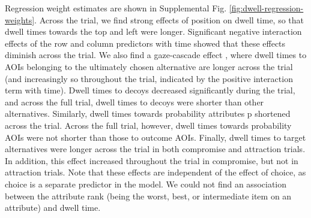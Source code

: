 \documentclass[11pt, a4paper]{article}
\begin{document}
\begin{refsection}
Regression weight estimates are shown in Supplemental Fig. \ref{fig:dwell-regression-weights}. Across the trial, we find strong effects of position on dwell time, so that dwell times towards the top and left were longer. Significant negative interaction effects of the row and column predictors with time showed that these effects diminish across the trial. We also find a gaze-cascade effect \parencite{mullett2016ImplicationsVisualAttention,shimojo2003GazeBiasBoth}, where dwell times to AOIs belonging to the ultimately chosen alternative are longer across the trial (and increasingly so throughout the trial, indicated by the positive interaction term with time). Dwell times to decoys decreased significantly during the trial, and across the full trial, dwell times to decoys were shorter than other alternatives. Similarly, dwell times towards probability attributes p shortened across the trial. Across the full trial, however, dwell times towards probability AOIs were not shorter than those to outcome AOIs. Finally, dwell times to target alternatives were longer across the trial in both compromise and attraction trials. In addition, this effect increased throughout the trial in compromise, but not in attraction trials. Note that these effects are independent of the effect of choice, as choice is a separate predictor in the model. We could not find an association between the attribute rank (being the worst, best, or intermediate item on an attribute) and dwell time.


\end{refsection}
\end{document}
